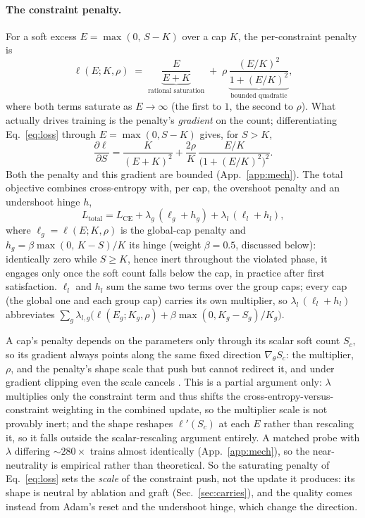 \documentclass[10pt]{article}
\begin{document}
\paragraph{The constraint penalty.}
For a soft excess $E = \max(0,\, S - K)$ over a cap $K$, the per-constraint
penalty is
\begin{equation}
\label{eq:loss}
\ell(E;K,\rho)\;=\;\underbrace{\frac{E}{E+K}}_{\text{rational saturation}}
\;+\;\rho\,\underbrace{\frac{(E/K)^2}{1+(E/K)^2}}_{\text{bounded quadratic}} ,
\end{equation}
where both terms saturate as $E\!\to\!\infty$ (the first to $1$, the second
to $\rho$). What actually drives training is the penalty's \emph{gradient}
on the count; differentiating Eq.~\eqref{eq:loss} through $E=\max(0,S-K)$
gives, for $S>K$,
\begin{equation}
\label{eq:grad}
\frac{\partial \ell}{\partial S}
= \frac{K}{(E+K)^2} + \frac{2\rho}{K}\,\frac{E/K}{\bigl(1+(E/K)^2\bigr)^2}.
\end{equation}
Both the penalty and this gradient are bounded (App.~\ref{app:mech}). The
total objective combines cross-entropy with, per cap, the overshoot penalty
and an undershoot hinge $h$,
\begin{equation}
\label{eq:total}
L_{\text{total}} = L_{\text{CE}} + \lambda_g\,(\ell_g + h_g) + \lambda_l\,(\ell_l + h_l) ,
\end{equation}
where $\ell_g=\ell(E;K,\rho)$ is the global-cap penalty and
$h_g=\beta\max(0,\,K-S)/K$ its hinge (weight $\beta{=}0.5$, discussed below):
identically zero while $S\ge K$, hence inert throughout the violated phase,
it engages only once the soft count falls below the cap, in practice after
first satisfaction. $\ell_l$ and $h_l$ sum the same two terms over the
group caps; every cap (the global one and each group cap) carries its own
multiplier, so $\lambda_l\,(\ell_l+h_l)$ abbreviates
$\sum_g \lambda_{l,g}\bigl(\ell(E_g;K_g,\rho)+\beta\max(0,K_g-S_g)/K_g\bigr)$.

A cap's penalty depends on the parameters only through its scalar soft count
$S_c$, so its gradient always points along the same fixed direction
$\nabla_\theta S_c$: the multiplier, $\rho$, and the penalty's shape scale
that push but cannot redirect it, and under gradient clipping even the scale
cancels \citep{pascanu2013difficulty}. This is a partial argument only:
$\lambda$ multiplies only the constraint term and thus shifts the
cross-entropy-versus-constraint weighting in the combined update, so the
multiplier scale is not provably inert; and the shape reshapes $\ell'(S_c)$
at each $E$ rather than rescaling it, so it falls outside the scalar-rescaling
argument entirely. A matched probe with $\lambda$ differing ${\sim}280\times$
trains almost identically (App.~\ref{app:mech}), so the near-neutrality is
empirical rather than theoretical. So the saturating penalty of
Eq.~\eqref{eq:loss} sets the \emph{scale} of the constraint push, not the
update it produces: its shape is neutral by ablation and graft
(Sec.~\ref{sec:carries}), and the quality comes instead from Adam's reset
and the undershoot hinge, which change the direction.
\end{document}
